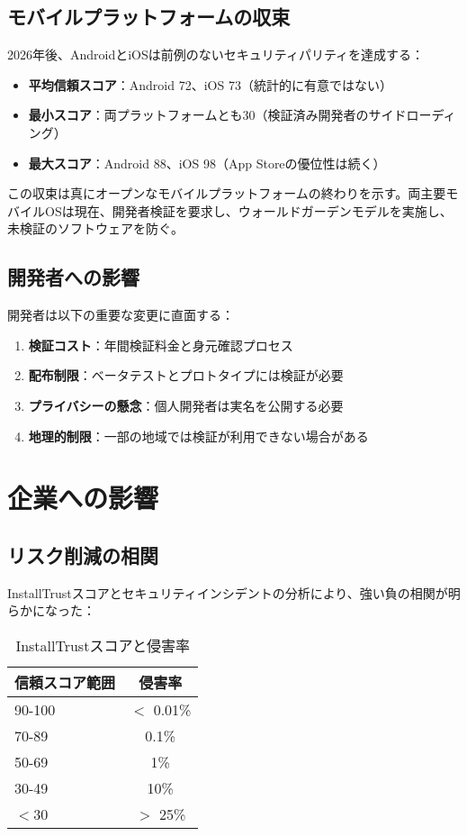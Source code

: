 \documentclass[Specialissue]{jsaiart}
\begin{document}
\subsection{モバイルプラットフォームの収束}

2026年後、AndroidとiOSは前例のないセキュリティパリティを達成する：

\begin{itemize}
    \item \textbf{平均信頼スコア}：Android 72、iOS 73（統計的に有意ではない）
    \item \textbf{最小スコア}：両プラットフォームとも30（検証済み開発者のサイドローディング）
    \item \textbf{最大スコア}：Android 88、iOS 98（App Storeの優位性は続く）
\end{itemize}

この収束は真にオープンなモバイルプラットフォームの終わりを示す。両主要モバイルOSは現在、開発者検証を要求し、ウォールドガーデンモデルを実施し、未検証のソフトウェアを防ぐ。

\subsection{開発者への影響}

開発者は以下の重要な変更に直面する：

\begin{enumerate}
    \item \textbf{検証コスト}：年間検証料金と身元確認プロセス
    \item \textbf{配布制限}：ベータテストとプロトタイプには検証が必要
    \item \textbf{プライバシーの懸念}：個人開発者は実名を公開する必要
    \item \textbf{地理的制限}：一部の地域では検証が利用できない場合がある
\end{enumerate}

\section{企業への影響}

\subsection{リスク削減の相関}

InstallTrustスコアとセキュリティインシデントの分析により、強い負の相関が明らかになった：

\begin{table}[ht]
\centering
\caption{InstallTrustスコアと侵害率}
\begin{tabular}{lc}
\toprule
\rowcolor{headergray}
\textbf{信頼スコア範囲} & \textbf{侵害率} \\
\midrule
90-100 & $<$ 0.01\% \\
70-89 & 0.1\% \\
50-69 & 1\% \\
30-49 & 10\% \\
$<$30 & $>$ 25\% \\
\bottomrule
\end{tabular}
\end{table}
\end{document}
